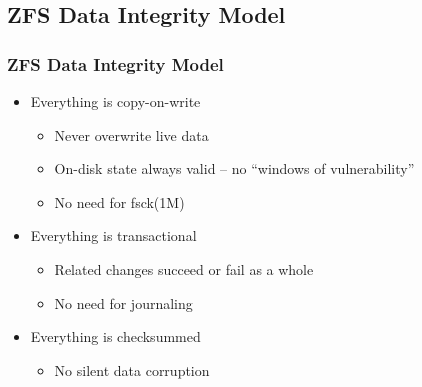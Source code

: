 \subsection{ZFS Data Integrity Model} %
\begin{frame}[fragile]
    \frametitle{ZFS Data Integrity Model}
    \begin{itemize}
        \item Everything is {\color{blue}copy-on-write}
        \begin{itemize}
            \item Never overwrite live data
            \item On-disk state always valid – no “windows of vulnerability”
            \item No need for fsck(1M)
        \end{itemize} \pause
        \item Everything is {\color{blue}transactional}
        \begin{itemize}
            \item Related changes succeed or fail as a whole
            \item No need for journaling
        \end{itemize} \pause
        \item Everything is {\color{blue}checksummed}
        \begin{itemize}
            \item No silent data corruption
        \end{itemize}
    \end{itemize}
\end{frame}
% 
% 
% 
% 
% 
